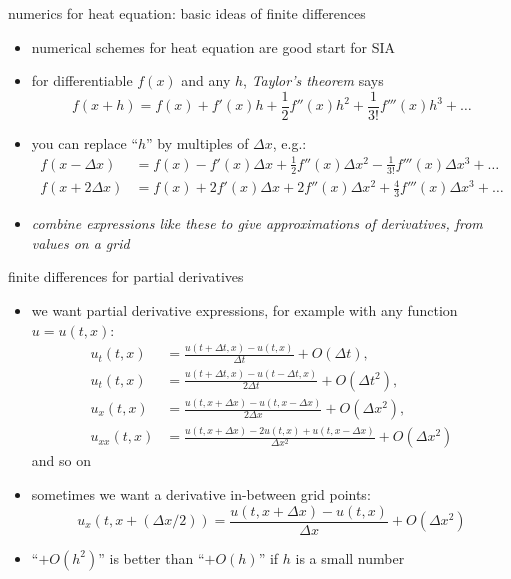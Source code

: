\begin{frame}{numerics for heat equation: basic ideas of finite differences}

\begin{itemize}
\item numerical schemes for heat equation are good start for SIA
\item for differentiable $f(x)$ and any $h$, \emph{Taylor's theorem} says
	$$f(x+h) = f(x) + f'(x) h + \frac{1}{2} f''(x) h^2 + \frac{1}{3!} f'''(x) h^3 + \dots$$
\normalsize
\item you can replace ``$h$'' by multiples of $\Delta x$, e.g.:
\small
\begin{align*}
f(x-\Delta x) &= f(x) - f'(x) \Delta x + \frac{1}{2} f''(x) \Delta x^2 - \frac{1}{3!} f'''(x) \Delta x^3 + \dots \\
f(x+2\Delta x) &= f(x) + 2 f'(x) \Delta x + 2 f''(x) \Delta x^2 + \frac{4}{3} f'''(x) \Delta x^3 + \dots
\end{align*}
\normalsize
\item \emph{combine expressions like these to give approximations of derivatives, from values on a grid}
\end{itemize}
\end{frame}


\begin{frame}{finite differences for partial derivatives}

\begin{itemize}
\item we want partial derivative expressions, for example with any function $u=u(t,x)$:
\small
\begin{align*}
u_t(t,x) &= \frac{u(t+\Delta t,x) - u(t,x)}{\Delta t} + O(\Delta t), \\
u_t(t,x) &= \frac{u(t+\Delta t,x) - u(t-\Delta t,x)}{2\Delta t} + O(\Delta t^2), \\
u_x(t,x) &= \frac{u(t,x+\Delta x) - u(t,x-\Delta x)}{2\Delta x} + O(\Delta x^2), \\
u_{xx}(t,x) &= \frac{u(t,x+\Delta x) - 2 u(t,x) + u(t,x-\Delta x)}{\Delta x^2} + O(\Delta x^2)
\end{align*}
\normalsize
and so on
\item sometimes we want a derivative in-between grid points:
\small
	$$u_x(t,x+(\Delta x/2)) = \frac{u(t,x+\Delta x) - u(t,x)}{\Delta x} + O(\Delta x^2)$$
\normalsize
\item ``$+O(h^2)$'' is better than ``$+O(h)$'' if $h$ is a small number
\end{itemize}
\end{frame}


